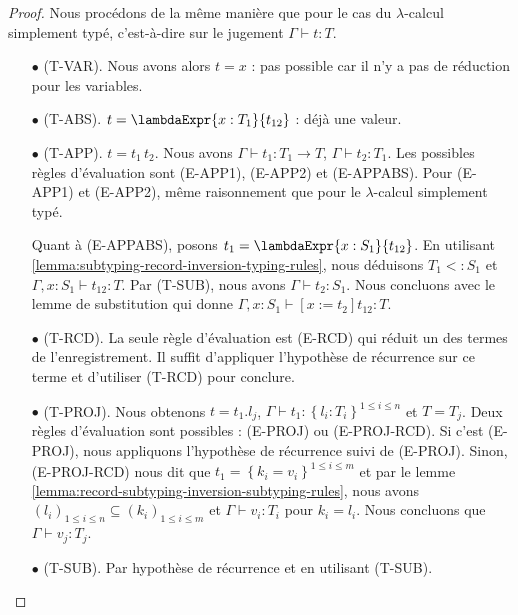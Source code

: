 \begin{proof}
  Nous procédons de la même manière que pour le cas du $\lambda$-calcul
  simplement typé, c'est-à-dire sur le jugement $\Gamma \vdash t : T$.
  \begin{itemize}
    \item[$\bullet$] (T-VAR). Nous avons alors $t = x$ : pas possible car il n'y a pas de
      réduction pour les variables.
      \item[$\bullet$] (T-ABS). $t = \lambdaExpr{x : T_{1}}{t_{12}}$ : déjà une valeur.
      \item[$\bullet$] (T-APP). $t = t_{1} \, t_{2}$. Nous avons
          $\Gamma \vdash t_{1} : T_{1} \rightarrow T$, $\Gamma \vdash t_{2}
          : T_{1}$.
          Les possibles règles d'évaluation
          sont (E-APP1), (E-APP2) et (E-APPABS). Pour (E-APP1) et (E-APP2), même
          raisonnement que pour le $\lambda$-calcul simplement typé.

          Quant à (E-APPABS), posons $t_{1} = \lambdaExpr{x : S_{1}}{t_{12}}$. En utilisant
          \ref{lemma:subtyping-record-inversion-typing-rules}, nous déduisons $T_{1} <:
          S_{1}$ et $\Gamma, x : S_{1} \vdash t_{12} : T$. Par (T-SUB), nous
          avons $\Gamma \vdash t_{2} : S_{1}$. Nous concluons avec le lemme de
          substitution qui donne $\Gamma, x : S_{1} \vdash [x := t_{2}]t_{12} :
          T$.

       \item[$\bullet$] (T-RCD). La seule règle d'évaluation est (E-RCD) qui réduit un des
         termes de l'enregistrement. Il suffit d'appliquer l'hypothèse de
         récurrence sur ce terme et d'utiliser (T-RCD) pour conclure.

       \item[$\bullet$] (T-PROJ). Nous obtenons $t = t_{1}.l_{j}$, $\Gamma \vdash t_{1}
         : \left\{ l_{i} : T_{i} \right\}^{1 \leq i \leq n}$ et $T = T_{j}$.
         Deux règles d'évaluation sont possibles : (E-PROJ) ou (E-PROJ-RCD). Si
         c'est (E-PROJ), nous appliquons l'hypothèse de récurrence suivi de (E-PROJ). Sinon,
         (E-PROJ-RCD) nous dit que $t_{1} = \left\{ k_{i} = v_{i} \right\}^{1
           \leq i \leq m}$ et par le lemme
         \ref{lemma:record-subtyping-inversion-subtyping-rules}, nous avons
         $(l_{i})_{1 \leq i \leq n} \subseteq (k_{i})_{1 \leq i \leq m}$ et
         $\Gamma \vdash v_{i} : T_{i}$ pour $k_{i} = l_{i}$. Nous concluons
         que $\Gamma \vdash v_{j} : T_{j}$.

       \item[$\bullet$] (T-SUB). Par hypothèse de récurrence et en utilisant (T-SUB).
  \end{itemize}
\end{proof}

